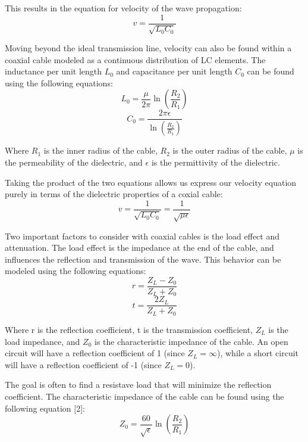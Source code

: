 \documentclass[12pt]{article}
\begin{document}
This results in the equation for velocity of the wave propagation:
\begin{equation}
    v = \frac{1}{\sqrt{L_0 C_0}}
    \label{eq:velocity_model}
\end{equation}

Moving beyond the ideal transmission line, velocity can also be found within a coaxial cable modeled as a continuous distribution of LC elements.
The inductance per unit length $L_0$ and capacitance per unit length $C_0$ can be found using the following equations:
\begin{equation}
    L_0 = \frac{\mu}{2\pi} \ln{\left(\frac{R_2}{R_1}\right)}
\end{equation}
\begin{equation}
    C_0 = \frac{2\pi \epsilon}{\ln{\left(\frac{R_2}{R_1}\right)}}
\end{equation}

Where $R_1$ is the inner radius of the cable, $R_2$ is the outer radius of the cable, $\mu$ is the permeability of the dielectric, and $\epsilon$ is the permittivity of the dielectric.

Taking the product of the two equations allows us express our velocity equation purely in terms of the dielectric properties of a coxial cable:
\begin{equation}
    v = \frac{1}{\sqrt{L_0C_0}} = \frac{1}{\sqrt{\mu \epsilon}}
    \label{eq:velocity_cable}
\end{equation}

Two important factors to consider with coaxial cables is the load effect and attenuation. The load effect is the impedance at the end of the cable, and influences the reflection and transmission of the wave. This behavior can be modeled using the following equations:
\begin{equation}
    r = \frac{Z_L - Z_0}{Z_L + Z_0}
\end{equation}
\begin{equation}
    t = \frac{2Z_L}{Z_L + Z_0}
\end{equation}

Where r is the reflection coefficient, t is the transmission coefficient, $Z_L$ is the load impedance, and $Z_0$ is the characteristic impedance of the cable. An open circuit will have a reflection coefficient of 1 (since $Z_L = \infty$), while a short circuit will have a reflection coefficient of -1 (since $Z_L = 0$).

The goal is often to find a resistave load that will minimize the reflection coefficient.
The characteristic impedance of the cable can be found using the following equation [2]:
\begin{equation}
    Z_0 = \frac{60}{\sqrt{\epsilon}} \ln{\left(\frac{R_2}{R_1}\right)}
    \label{eq:impedance}
\end{equation}
\end{document}
